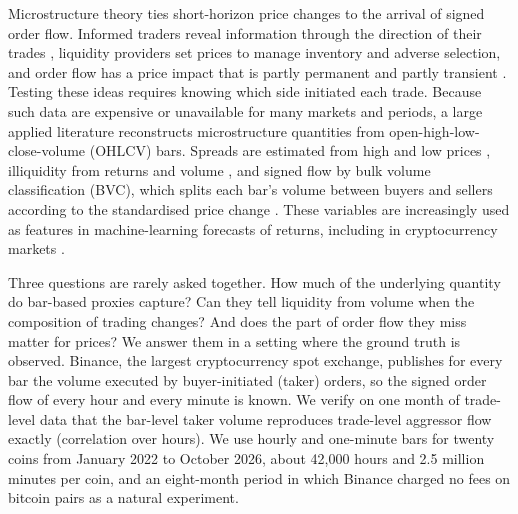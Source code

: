 \documentclass[11pt]{article}
\begin{document}
Microstructure theory ties short-horizon price changes to the arrival of signed order flow. Informed
traders reveal information through the direction of their trades \citep{kyle1985,glosten1985},
liquidity providers set prices to manage inventory and adverse selection, and order flow has a price
impact that is partly permanent and partly transient \citep{bouchaud2018}. Testing these ideas
requires knowing which side initiated each trade. Because such data are expensive or unavailable for
many markets and periods, a large applied literature reconstructs microstructure quantities from
open-high-low-close-volume (OHLCV) bars. Spreads are estimated from high and low prices
\citep{corwin2012,abdi2017}, illiquidity from returns and volume \citep{amihud2002}, and signed flow
by bulk volume classification (BVC), which splits each bar's volume between buyers and sellers
according to the standardised price change \citep{easley2012,easley2016}. These variables are
increasingly used as features in machine-learning forecasts of returns, including in cryptocurrency
markets \citep{easley2021machine,easley2024crypto}.

Three questions are rarely asked together. How much of the underlying quantity do bar-based proxies
capture? Can they tell liquidity from volume when the composition of trading changes? And does the
part of order flow they miss matter for prices? We answer them in a setting where the ground truth is
observed. Binance, the largest cryptocurrency spot exchange, publishes for every bar the volume
executed by buyer-initiated (taker) orders, so the signed order flow of every hour and every minute
is known. We verify on one month of trade-level data that the bar-level taker volume reproduces
trade-level aggressor flow exactly (correlation \aggCorr{} over \aggHours{} hours). We use hourly and
one-minute bars for twenty coins from January 2022 to October 2026, about 42{,}000 hours and
2.5 million minutes per coin, and an eight-month period in which Binance charged no fees on bitcoin
pairs as a natural experiment.
\end{document}
